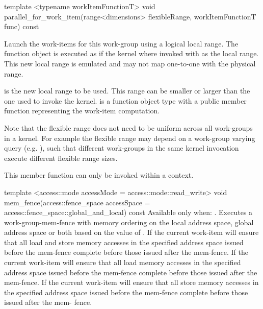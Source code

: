   \addRowThreeL
    {template <typename workItemFunctionT>}
    {void parallel_for_work_item(range<dimensions> }
    { flexibleRange, workItemFunctionT func) const}
    {
      Launch the work-items for this work-group using a logical local range.
      The function object  is executed as if the kernel where
      invoked with  as the local range. This new local
      range is emulated and may not map one-to-one with the physical range.
      
       is the new local range to be used.
      This range can be smaller or larger than the one used to invoke the kernel.
       is a function object type with a public member function
      representing the work-item computation.

      Note that the flexible range does not need to be uniform
      across all work-groups in a kernel.  For example the flexible range may depend on
      a work-group varying query (e.g. ),
      such that different work-groups in the same kernel invocation execute
      different flexible range sizes.

      This member function can only be invoked within a
       context.
    }
  \addRowFourL
    { template <access::mode accessMode = }
    { access::mode::read_write> }
    { void mem_fence(access::fence_space accessSpace = }
    { access::fence_space::global_and_local) const }
    {
      Available only when: .
      \newline
      Executes a \gls{work-group-mem-fence} with memory ordering on the local
      address space, global address space or both based on the value of
      . If  the current work-item will ensure that all load
      and store memory accesses in the specified address space issued before the
      mem-fence complete before those issued after the mem-fence. If
       the current work-item will
      ensure that all load memory accesses in the specified address space issued
      before the mem-fence complete before those issued after the mem-fence. If
       the current work-item will
      ensure that all store memory accesses in the specified address space
      issued before the mem-fence complete before those issued after the mem-
      fence.
    }
